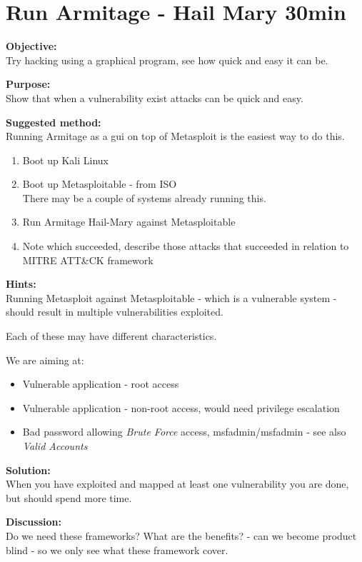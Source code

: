 \documentclass[a4paper,11pt,notitlepage]{report}
\begin{document}
\chapter{Run Armitage - Hail Mary 30min}
\label{ex:hail-mary}

{\bf Objective:}\\
Try hacking using a graphical program, see how quick and easy it can be.

{\bf Purpose:}\\
Show that when a vulnerability exist attacks can be quick and easy.

{\bf Suggested method:}\\

Running Armitage as a gui on top of Metasploit is the easiest way to do this.

\begin{enumerate}
\item Boot up Kali Linux
\item Boot up Metasploitable - from ISO\\
There may be a couple of systems already running this.
\item Run Armitage Hail-Mary against Metasploitable
\item Note which succeeded, describe those attacks that succeeded in relation to MITRE ATT\&CK framework
\end{enumerate}

{\bf Hints:}\\
Running Metasploit against Metasploitable - which is a vulnerable system - should result in multiple vulnerabilities exploited.

Each of these may have different characteristics.

We are aiming at:
\begin{itemize}
\item Vulnerable application - root access
\item Vulnerable application - non-root access, would need privilege escalation
\item Bad password allowing \emph{Brute Force} access, msfadmin/msfadmin - see also \emph{Valid Accounts}
\end{itemize}


{\bf Solution:}\\
When you have exploited and mapped at least one vulnerability you are done, but should spend more time.

{\bf Discussion:}\\
Do we need these frameworks? What are the benefits? - can we become product blind - so we only see what these framework cover.
\end{document}
